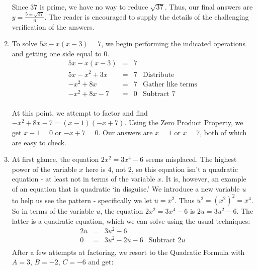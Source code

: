 \documentclass[10pt]{article}
\begin{document}
\begin{ex}
\begin{enumerate}
\[\begin{array}{rclr}
\end{array} \] Since $37$ is prime, we have no way to reduce $\sqrt{37}$.  Thus, our final answers are $y = \frac{5 \pm \sqrt{37}}{6}$. The reader is encouraged to supply the details of the challenging verification of the answers.

\item To solve $5x - x(x-3) = 7$, we begin performing the indicated operations and getting one side equal to $0$.\[ \begin{array}{rclr}

5x - x(x-3) & = & 7 & \\

5x - x^2 + 3x & = & 7 & \text{Distribute} \\

-x^2 + 8x & = & 7 & \text{Gather like terms} \\

-x^2 + 8x - 7 & = & 0& \text{Subtract $7$} \\

\end{array}\]

At this point, we attempt to factor and find $-x^2 + 8x - 7 = (x-1)(-x+7)$.  Using the Zero Product Property, we get $x-1 = 0$  or $-x+7 = 0$.  Our answers are $x = 1$ or $x = 7$, both of which are easy to check.



\item At first glance, the equation $2x^2 = 3x^4 - 6$ seems misplaced.  The highest power of the variable $x$ here is $4$, not $2$, so this equation isn't a quadratic equation - at least not in terms of the variable $x$.  It is, however, an example of an equation that is quadratic `in disguise.' We introduce a new variable $u$ to help us see the pattern - specifically we let $u = x^2$.  Thus $u^2 = (x^2)^2 = x^4$.  So in terms of the variable $u$, the equation $2x^2 = 3x^4 - 6$ is $2u = 3u^2 - 6$.  The latter is a quadratic equation, which we can solve using the usual techniques:\[ \begin{array}{rclr}

2u & = & 3u^2 - 6 & \\

0 & = & 3u^2 - 2u - 6 & \text{Subtract $2u$} \\

\end{array}\] After a few attempts at factoring, we resort to the Quadratic Formula with $A = 3$, $B = -2$, $C = -6$ and get:\[ \begin{array}{rclr}


\end{array}\]
\end{enumerate}
\end{ex}
\end{document}
